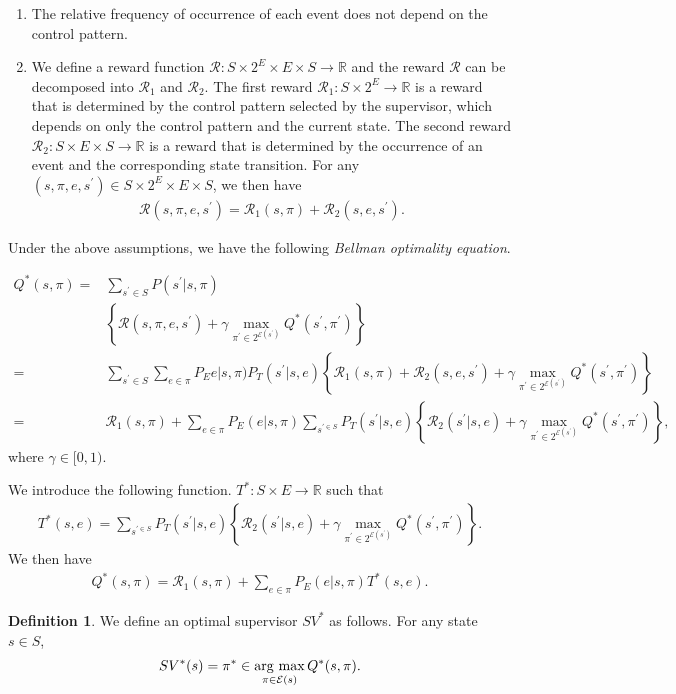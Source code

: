 \documentclass[10 pt, dvipdfmx]{article}
\theoremstyle{definition}
\newtheorem{definition}{Definition}[section]
\newcommand{\argmax}{\mathop{\rm arg~max}\limits}
\begin{document}
\begin{enumerate}
  \item The relative frequency of occurrence of each event does not depend on the control pattern.
  \item We define a reward function $\mathcal{R} : S \times 2^E \times E \times S \rightarrow \mathbb{R}$ and the reward $\mathcal{R}$ can be decomposed into $\mathcal{R}_1$ and $\mathcal{R}_2$. The first reward $\mathcal{R}_1 : S \times 2^E \rightarrow \mathbb{R}$ is a reward that is determined by the control pattern selected by the supervisor, which depends on only the control pattern and the current state. The second reward $\mathcal{R}_2 : S \times E \times S \rightarrow \mathbb{R}$ is a reward that is determined by the occurrence of an event and the corresponding state transition. For any $(s,\pi,e,s^{\prime}) \in S \times 2^E \times E \times S$, we then have
  \begin{align}
    \mathcal{R}(s,\pi,e,s^{\prime}) = \mathcal{R}_1(s,\pi) + \mathcal{R}_2(s,e,s^{\prime}).
  \end{align}
\end{enumerate}
Under the above assumptions, we have the following {\it Bellman optimality equation}.

\begin{align}
  Q^{\ast}(s,\pi) = & \sum_{s^{\prime} \in S} P(s^{\prime}|s,\pi)\nonumber \\
  & \left \{ \mathcal{R}(s,\pi,e,s^{\prime}) + \gamma \max_{\pi^{\prime} \in 2^{\mathcal{E}(s^{\prime})}} Q^{\ast}(s^{\prime},\pi^{\prime}) \right \} \nonumber \\
  = & \sum_{s^{\prime} \in S} \sum_{e \in \pi} P_Ee|s,\pi) P_T(s^{\prime}|s,e) \left \{ \mathcal{R}_1(s,\pi) + \mathcal{R}_2(s,e,s^{\prime}) + \gamma \max_{\pi^{\prime} \in 2^{\mathcal{E}(s^{\prime})}} Q^{\ast}(s^{\prime},\pi^{\prime}) \right \} \nonumber \\
  = & \mathcal{R}_1(s,\pi) + \sum_{e \in \pi} P_E(e|s,\pi) \sum_{s^{\prime \in S}} P_T(s^{\prime}|s,e) \left \{ \mathcal{R}_2(s^{\prime}|s,e) + \gamma \max_{\pi^{\prime} \in 2^{\mathcal{E}(s^{\prime})}} Q^{\ast}(s^{\prime}, \pi^{\prime}) \right \},
\end{align}
where $\gamma \in [0,1)$.

We introduce the following function. $T^{\ast} : S \times E \rightarrow \mathbb{R}$ such that
\begin{align}
  T^{\ast}(s,e) = \sum_{s^{\prime \in S}} P_T(s^{\prime}|s,e) \left \{ \mathcal{R}_2(s^{\prime}|s,e) + \gamma \max_{\pi^{\prime} \in 2^{\mathcal{E}(s^{\prime})}} Q^{\ast}(s^{\prime}, \pi^{\prime}) \right \}.
\end{align}
We then have
\begin{align}
  Q^{\ast}(s,\pi) = \mathcal{R}_1(s,\pi) + \sum_{e \in \pi}P_E(e|s,\pi) T^{\ast}(s,e).
\end{align}
\begin{definition}
We define an optimal supervisor $SV^{\ast}$ as follows. For any state $s \in S$,
\begin{align}
  SV^{\ast}(s) = \pi^{\ast} \in \argmax_{\pi \in \mathcal{E}(s)} Q^{\ast}(s,\pi).
\end{align}
\end{definition}
\end{document}
